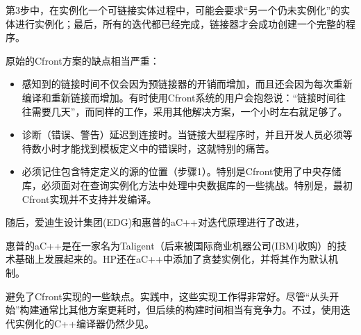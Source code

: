 第3步中，在实例化一个可链接实体过程中，可能会要求“另一个仍未实例化”的实体进行实例化；最后，所有的迭代都已经完成，链接器才会成功创建一个完整的程序。

原始的Cfront方案的缺点相当严重：

\begin{itemize}
\item 
感知到的链接时间不仅会因为预链接器的开销而增加，而且还会因为每次重新编译和重新链接而增加。有时使用Cfront系统的用户会抱怨说：“链接时间往往需要几天”，而同样的工作，采用其他解决方案，一个小时左右就足够了。

\item 
诊断（错误、警告）延迟到连接时。当链接大型程序时，并且开发人员必须等待数小时才能找到模板定义中的错误时，这就特别的痛苦。

\item 
必须记住包含特定定义的源的位置（步骤1）。特别是Cfront使用了中央存储库，必须面对在查询实例化方法中处理中央数据库的一些挑战。特别是，最初Cfront实现并不支持并发编译。
\end{itemize}

随后，爱迪生设计集团(EDG)和惠普的aC++对迭代原理进行了改进，

\begin{notice}
惠普的aC++是在一家名为Taligent（后来被国际商业机器公司(IBM)收购）的技术基础上发展起来的。HP还在aC++中添加了贪婪实例化，并将其作为默认机制。
\end{notice}

避免了Cfront实现的一些缺点。实践中，这些实现工作得非常好。尽管“从头开始”构建通常比其他方案更耗时，但后续的构建时间相当有竞争力。不过，使用迭代实例化的C++编译器仍然少见。
















